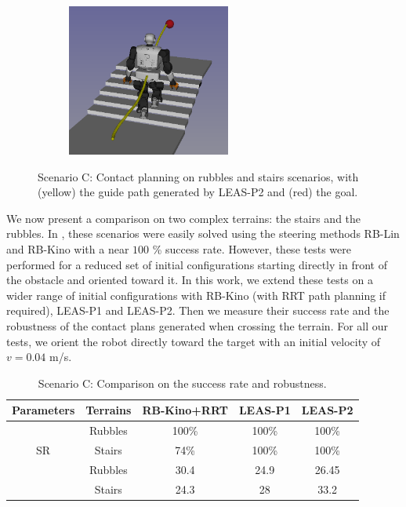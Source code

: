 \begin{figure}[H]
\begin{subfigure}[t]{0.4\linewidth}
    \end{subfigure}
    \begin{subfigure}[t]{0.4\linewidth}
        \includegraphics[width=\textwidth, height=5cm]{Figures/Chapter_CPSB/stairs_diago1.png}
    \end{subfigure}
    \caption{Scenario C: Contact planning on rubbles and stairs scenarios, with (yellow) the guide path generated by LEAS-P2 and (red) the goal.}
    \label{fig:cp-sb:talos_stairs_rubbles_example}
\end{figure}
We now present a comparison on two complex terrains: the stairs and the rubbles.
In \cite{AcyclicCP}, these scenarios were easily solved using the steering methods RB-Lin and RB-Kino with a near $100$ \% success rate. 
However, these tests were performed for a reduced set of initial configurations starting directly in front of the obstacle and oriented toward it. 
In this work, we extend these tests on a wider range of initial configurations with RB-Kino (with RRT path planning if required), LEAS-P1 and LEAS-P2. Then we measure their success rate and the robustness of the contact plans generated when crossing the terrain.
For all our tests, we orient the robot directly toward the target with an initial velocity of $v=0.04$ m/s. \hfill \break

\begin{table}[h]
\centering
\caption{Scenario C: Comparison on the success rate and robustness. \label{tab:SBCP:rubbles_robustness}}
\begin{tabular}{ |c|c|c|c|c| }
    \hline
    Parameters & Terrains & RB-Kino+RRT & LEAS-P1 & LEAS-P2\\
    \hline \hline
    \multirow{3}{*}{SR} & Rubbles & 100\% & 100\% & 100\% \\
    \cline{2-5}
                        & Stairs & 74\% & 100\% & 100\% \\
    \hline \hline
    \multirow{3}{*}{Robustness} & Rubbles & 30.4 & 24.9 & 26.45 \\
    \cline{2-5}
                                & Stairs  & 24.3 & 28 & 33.2 \\
    \hline
\end{tabular}
\label{tab:cp-sb:rubbles_stairs}
\end{table}

